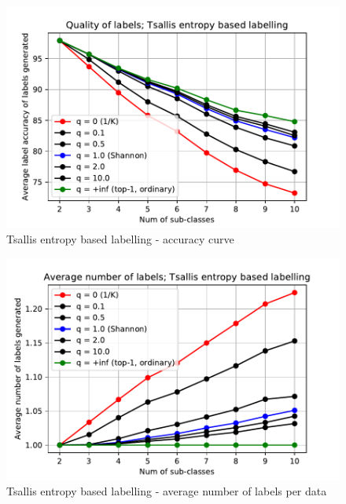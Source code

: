 \documentclass[a4paper,conference]{IEEEtran}
\begin{document}
\begin{figure}[t]
\begin{center}
    \includegraphics[width=1.0\linewidth]{figs/graphs/tsallis-qs.pdf}
    \caption{Tsallis entropy based labelling - accuracy curve}
    \label{fig:tsallis_acc}
\end{center}
\end{figure}

\begin{figure}[t]
\begin{center}
    \includegraphics[width=1.0\linewidth]{figs/graphs/tsallis-qs-lnum.pdf}
    \caption{Tsallis entropy based labelling - average number of labels per data}
    \label{fig:tsallis_ave_lnum}
\end{center}
\end{figure}
\end{document}
